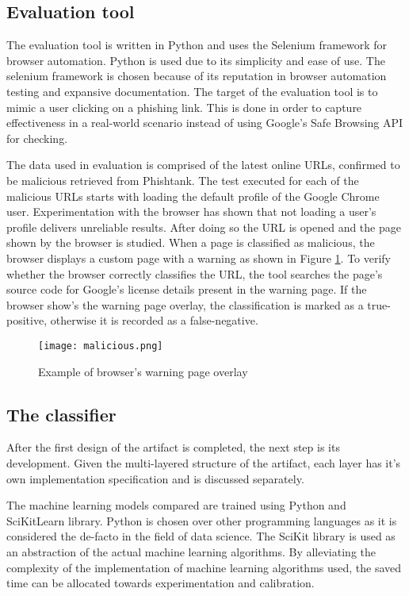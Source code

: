 \subsection{Evaluation tool}
The evaluation tool is written in Python and uses the Selenium framework for browser automation. Python is used due to its simplicity and ease of use. The selenium framework is chosen because of its reputation in browser automation testing and expansive documentation. The target of the evaluation tool is to mimic a user clicking on a phishing link. This is done in order to capture effectiveness in a real-world scenario instead of using Google's Safe Browsing API for checking.

The data used in evaluation is comprised of the latest online URLs, confirmed to be malicious retrieved from Phishtank. The test executed for each of the malicious URLs starts with loading the default profile of the Google Chrome user. Experimentation with the browser has shown that not loading a user's profile delivers unreliable results. After doing so the URL is opened and the page shown by the browser is studied. When a page is classified as malicious, the browser displays a custom page with a warning as shown in Figure \ref{fig:PHISHING_PREVENTED}. To verify whether the browser correctly classifies the URL, the tool searches the page's source code for Google's license details present in the warning page. If the browser show's the warning page overlay, the classification is marked as a true-positive, otherwise it is recorded as a false-negative.

\begin{figure}
	\centering
	\texttt{[image: malicious.png]}
	\caption{Example of browser's warning page overlay}
	\label{fig:PHISHING_PREVENTED}
\end{figure}

\subsection{The classifier}
After the first design of the artifact is completed, the next step is its development. Given the multi-layered structure of the artifact, each layer has it's own implementation specification and is discussed separately.

The machine learning models compared are trained using Python and SciKitLearn library. Python is chosen over other programming languages as it is considered the de-facto in the field of data science. The SciKit library is used as an abstraction of the actual machine learning algorithms. By alleviating the complexity of the implementation of machine learning algorithms used, the saved time can be allocated towards experimentation and calibration.

